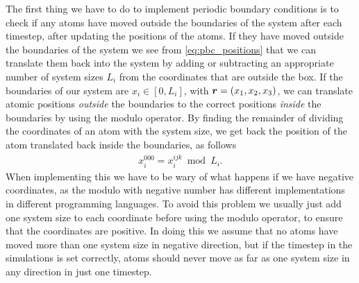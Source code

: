 The first thing we have to do to implement periodic boundary conditions is to check if any atoms have moved outside the boundaries of the system after each timestep, after updating the positions of the atoms. If they have moved outside the boundaries of the system we see from \cref{eq:pbc_positions} that we can translate them back into the system by adding or subtracting an appropriate number of system sizes $L_i$ from the coordinates that are outside the box. If the boundaries of our system are $x_i \in [0, L_i]$, with $\boldsymbol{r} = (x_1, x_2, x_3)$, we can translate atomic positions \emph{outside} the boundaries to the correct positions \emph{inside} the boundaries by using the modulo operator. By finding the remainder of dividing the coordinates of an atom with the system size, we get back the position of the atom translated back inside the boundaries, as follows
\begin{align*}
    x_i^{000} = x_i^{ijk} \bmod L_i.
\end{align*}
When implementing this we have to be wary of what happens if we have negative coordinates, as the modulo with negative number has different implementations in different programming languages. To avoid this problem we usually just add one system size to each coordinate before using the modulo operator, to ensure that the coordinates are positive. In doing this we assume that no atoms have moved more than one system size in negative direction, but if the timestep in the simulations is set correctly, atoms should never move as far as one system size in any direction in just one timestep.
%

